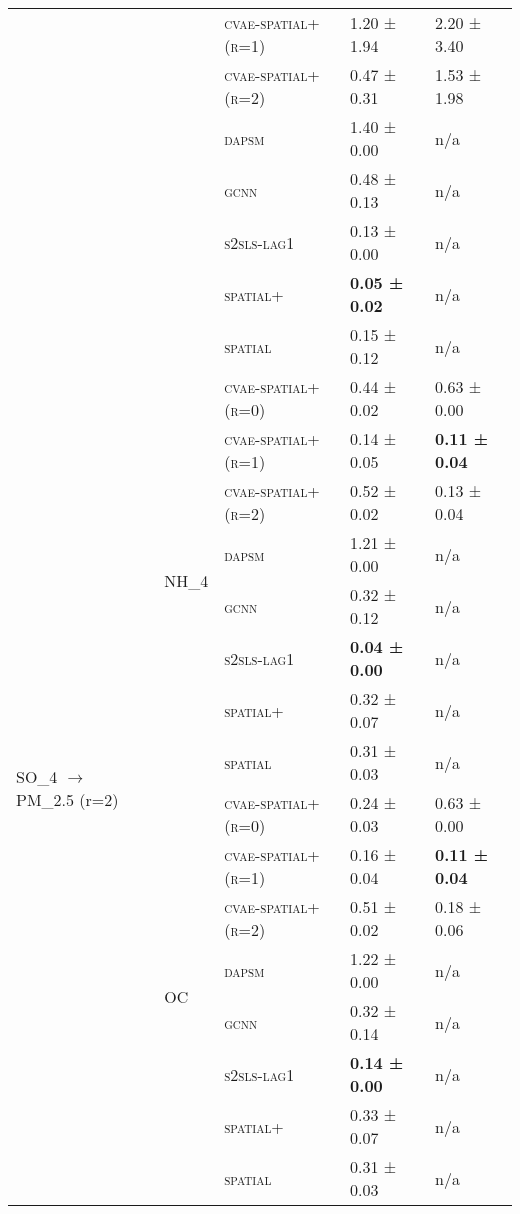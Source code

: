 \documentclass{article}
\begin{document}
\begin{table}[!tbp]
\begin{tabular}{lllll}
 &  & \textsc{cvae-spatial+ (r=1)} & 1.20 ± {\small 1.94} & 2.20 ± {\small 3.40} \\
 &  & \textsc{cvae-spatial+ (r=2)} & 0.47 ± {\small 0.31} & 1.53 ± {\small 1.98} \\
 &  & \textsc{dapsm} & 1.40 ± {\small 0.00} & n/a \\
 &  & \textsc{gcnn} & 0.48 ± {\small 0.13} & n/a \\
 &  & \textsc{s2sls-lag1} & 0.13 ± {\small 0.00} & n/a \\
 &  & \textsc{spatial+} & \bf 0.05 ± {\small 0.02} & n/a \\
 &  & \textsc{spatial} & 0.15 ± {\small 0.12} & n/a \\
\cline{1-5} \cline{2-5}
\multirow[t]{16}{*}{SO_{4} $\to$ PM_{2.5} (r=2)} & \multirow[t]{8}{*}{NH_4} & \textsc{cvae-spatial+ (r=0)} & 0.44 ± {\small 0.02} & 0.63 ± {\small 0.00} \\
 &  & \textsc{cvae-spatial+ (r=1)} & 0.14 ± {\small 0.05} & \bf 0.11 ± {\small 0.04} \\
 &  & \textsc{cvae-spatial+ (r=2)} & 0.52 ± {\small 0.02} & 0.13 ± {\small 0.04} \\
 &  & \textsc{dapsm} & 1.21 ± {\small 0.00} & n/a \\
 &  & \textsc{gcnn} & 0.32 ± {\small 0.12} & n/a \\
 &  & \textsc{s2sls-lag1} & \bf 0.04 ± {\small 0.00} & n/a \\
 &  & \textsc{spatial+} & 0.32 ± {\small 0.07} & n/a \\
 &  & \textsc{spatial} & 0.31 ± {\small 0.03} & n/a \\
\cline{2-5}
 & \multirow[t]{8}{*}{OC} & \textsc{cvae-spatial+ (r=0)} & 0.24 ± {\small 0.03} & 0.63 ± {\small 0.00} \\
 &  & \textsc{cvae-spatial+ (r=1)} & 0.16 ± {\small 0.04} & \bf 0.11 ± {\small 0.04} \\
 &  & \textsc{cvae-spatial+ (r=2)} & 0.51 ± {\small 0.02} & 0.18 ± {\small 0.06} \\
 &  & \textsc{dapsm} & 1.22 ± {\small 0.00} & n/a \\
 &  & \textsc{gcnn} & 0.32 ± {\small 0.14} & n/a \\
 &  & \textsc{s2sls-lag1} & \bf 0.14 ± {\small 0.00} & n/a \\
 &  & \textsc{spatial+} & 0.33 ± {\small 0.07} & n/a \\
 &  & \textsc{spatial} & 0.31 ± {\small 0.03} & n/a \\
\cline{1-5} \cline{2-5}
\bottomrule
\end{tabular}

\end{table}
\end{document}
